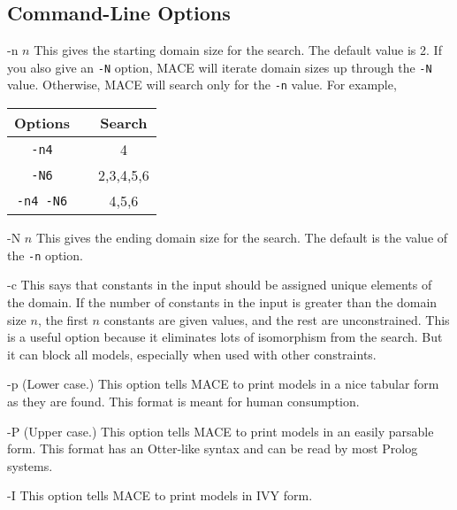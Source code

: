 \documentclass[11pt]{article}
\begin{document}
\subsection{Command-Line Options}

\newenvironment{clo}%
        {\begin{list}{}{\renewcommand{\makelabel}[1]{\texttt{##1}\hfil}%
                \setlength{\labelwidth}{1.25cm}%
                \setlength{\leftmargin}{2cm}}}%
        {\end{list}}

\begin{clo}
\item[-n $n$]
This gives the starting domain size for the search.
The default value is 2.  If you also give an \texttt{-N} option,
MACE will iterate domain sizes up through the \texttt{-N}
value.
Otherwise, MACE will search only for the \texttt{-n} value.
For example,
\begin{center}
\begin{tabular}{ccc}
\hline
Options &\hspace*{.5cm}& Search \\
\hline
\texttt{-n4}     & & 4 \\
\texttt{-N6}     & & 2,3,4,5,6 \\
\texttt{-n4 -N6} & & 4,5,6 \\
\hline
\end{tabular}
\end{center}
\item[-N $n$]
This gives the ending domain size for the search.
The default is the value of the \texttt{-n} option.
\item[-c]
This says that constants in the input should be assigned
unique elements of the domain.  If the number of constants
in the input is greater than the domain size $n$, the first
$n$ constants are given values, and the rest are unconstrained.
This is a useful option because it eliminates lots
of isomorphism from the search.  But it can block all models,
especially when used with other constraints.
\item[-p]
(Lower case.) This option tells MACE to print models in a nice
tabular form as they are found.  This format is meant
for human consumption.
\item[-P]
(Upper case.) This option tells MACE to print models in an easily parsable
form.  This format has an Otter-like syntax and can be read by
most Prolog systems.
\item[-I]
This option tells MACE to print models in IVY form.

\end{clo}
\end{document}

